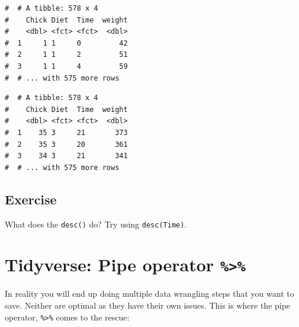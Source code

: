 \documentclass[a4paper,9pt,twocolumn,twoside,printwatermark=false]{pinp}
\begin{document}
\begin{ShadedResult}
\begin{verbatim}
#  # A tibble: 578 x 4
#    Chick Diet  Time  weight
#    <dbl> <fct> <fct>  <dbl>
#  1     1 1     0         42
#  2     1 1     2         51
#  3     1 1     4         59
#  # ... with 575 more rows
\end{verbatim}
\end{ShadedResult}

\begin{Shaded}
\begin{Highlighting}[]
\end{Highlighting}
\end{Shaded}

\begin{ShadedResult}
\begin{verbatim}
#  # A tibble: 578 x 4
#    Chick Diet  Time  weight
#    <dbl> <fct> <fct>  <dbl>
#  1    35 3     21       373
#  2    35 3     20       361
#  3    34 3     21       341
#  # ... with 575 more rows
\end{verbatim}
\end{ShadedResult}

\subsection{Exercise}\label{exercise-8}

What does the \texttt{desc()} do? Try using \texttt{desc(Time)}.

\section{\texorpdfstring{Tidyverse: Pipe operator
\texttt{\%\textgreater{}\%}}{Tidyverse: Pipe operator \%\textgreater{}\%}}\label{tidyverse-pipe-operator}

In reality you will end up doing multiple data wrangling steps that you
want to save. Neither are optimal as they have their own issues. This is
where the pipe operator, \texttt{\%\textgreater{}\%} comes to the
rescue:

\begin{Shaded}
\end{Shaded}
\end{document}
